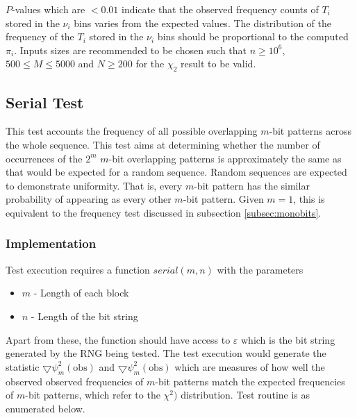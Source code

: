 $P$-values which are $<0.01$ indicate that the observed frequency counts of $T_i$ stored in the $\nu_i$ bins varies from the expected values. The distribution of the frequency of the $T_i$ stored in the $\nu_i$ bins should be proportional to the computed $\pi_i$. Inputs sizes are recommended to be chosen such that $n\geq10^6$, $500 \leq M \leq 5000$ and $N\geq200$ for the $\chi_2$ result to be valid.

\subsection{Serial Test}

This test accounts the frequency of all possible overlapping $m$-bit patterns across the whole sequence. This test aims at determining whether the number of occurrences of the $2^m$ $m$-bit overlapping patterns is approximately the same as that would be expected for a random sequence. Random sequences are expected to demonstrate uniformity. That is, every $m$-bit pattern has the similar probability of appearing as every other $m$-bit pattern. Given $m=1$, this is equivalent to the frequency test discussed in subsection \ref{subsec:monobits}.

\subsubsection{Implementation}

Test execution requires a function $serial(m,n)$ with the parameters

\begin{itemize}
    \item $m$ - Length of each block
    \item $n$ - Length of the bit string
\end{itemize}

Apart from these, the function should have access to $\varepsilon$ which is the bit string generated by the RNG being tested. The test execution would generate the statistic $\bigtriangledown\psi^2_m(\text{obs})$ and $\bigtriangledown\psi^2_m(\text{obs})$ which are measures of how well the observed observed frequencies of $m$-bit patterns match the expected frequencies of $m$-bit patterns, which refer to the $\chi^2)$ distribution. Test routine is as enumerated below.

